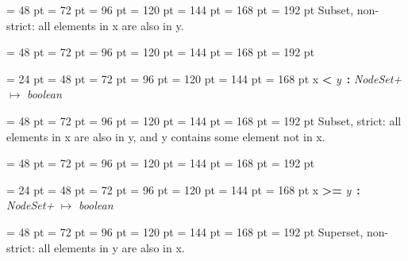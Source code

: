 {{{{\par \noindent  \leftskip = 48 pt  \leftmargini = 72 pt  \leftmarginii = 96 pt  \leftmarginiii = 120 pt  \leftmarginiv = 144 pt  \leftmarginv = 168 pt  \leftmarginvi = 192 pt 
Subset, non-strict:
             all elements in x are also in y.\par}
{\par \noindent  \leftskip = 48 pt  \leftmargini = 72 pt  \leftmarginii = 96 pt  \leftmarginiii = 120 pt  \leftmarginiv = 144 pt  \leftmarginv = 168 pt  \leftmarginvi = 192 pt {\par \noindent
\par}
\par}
\par}
\par}
{\par \noindent  \leftskip = 24 pt  \leftmargini = 48 pt  \leftmarginii = 72 pt  \leftmarginiii = 96 pt  \leftmarginiv = 120 pt  \leftmarginv = 144 pt  \leftmarginvi = 168 pt x {\large {\bf {\textless}\/}} {\em y\/}~{\bf :}  {\em NodeSet+\/} \(\mapsto \)  {\em boolean\/}{\par \noindent
{\par \noindent  \leftskip = 48 pt  \leftmargini = 72 pt  \leftmarginii = 96 pt  \leftmarginiii = 120 pt  \leftmarginiv = 144 pt  \leftmarginv = 168 pt  \leftmarginvi = 192 pt 
Subset, strict:
             all elements in x are also in y,
             and y contains some element not in x.
\par}
{\par \noindent  \leftskip = 48 pt  \leftmargini = 72 pt  \leftmarginii = 96 pt  \leftmarginiii = 120 pt  \leftmarginiv = 144 pt  \leftmarginv = 168 pt  \leftmarginvi = 192 pt {\par \noindent
\par}
\par}
\par}
\par}
{\par \noindent  \leftskip = 24 pt  \leftmargini = 48 pt  \leftmarginii = 72 pt  \leftmarginiii = 96 pt  \leftmarginiv = 120 pt  \leftmarginv = 144 pt  \leftmarginvi = 168 pt x {\large {\bf {\textgreater}=\/}} {\em y\/}~{\bf :}  {\em NodeSet+\/} \(\mapsto \)  {\em boolean\/}{\par \noindent
{\par \noindent  \leftskip = 48 pt  \leftmargini = 72 pt  \leftmarginii = 96 pt  \leftmarginiii = 120 pt  \leftmarginiv = 144 pt  \leftmarginv = 168 pt  \leftmarginvi = 192 pt 
Superset, non-strict:
             all elements in y are also in x.
}}}}
